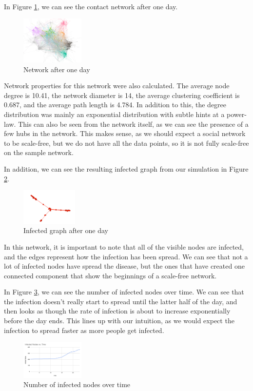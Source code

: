 \documentclass[times, 10pt,twocolumn]{article}
\begin{document}
In Figure \ref{fig:my_label}, we can see the contact network after one day.
\begin{figure}
    \centering
    \includegraphics[width=0.28\textwidth]{imgs/one_day_net.png}
    \caption{Network after one day}
    \label{fig:my_label}
\end{figure}
Network properties for this network were also calculated. The average node degree is 10.41, the network diameter is 14, the average clustering coefficient is 0.687, and the average path length is 4.784. In addition to this, the degree distribution was mainly an exponential distribution with subtle hints at a power-law. This can also be seen from the network itself, as we can see the presence of a few hubs in the network. This makes sense, as we should expect a social network to be scale-free, but we do not have all the data points, so it is not fully scale-free on the sample network.

In addition, we can see the resulting infected graph from our simulation in Figure \ref{fig:my_label2}.
\begin{figure}
    \centering
    \includegraphics[width=0.25\textwidth]{imgs/simulation.png}
    \caption{Infected graph after one day}
    \label{fig:my_label2}
\end{figure}
In this network, it is important to note that all of the visible nodes are infected, and the edges represent how the infection has been spread. We can see that not a lot of infected nodes have spread the disease, but the ones that have created one connected component that show the beginnings of a scale-free network. 

In Figure \ref{fig:my_label3}, we can see the number of infected nodes over time. We can see that the infection doesn't really start to spread until the latter half of the day, and then looks as though the rate of infection is about to increase exponentially before the day ends. This lines up with our intuition, as we would expect the infection to spread faster as more people get infected.
\begin{figure}
    \centering
    \includegraphics[width=0.28\textwidth]{imgs/infected_over_time.png}
    \caption{Number of infected nodes over time}
    \label{fig:my_label3}
\end{figure}
\end{document}
